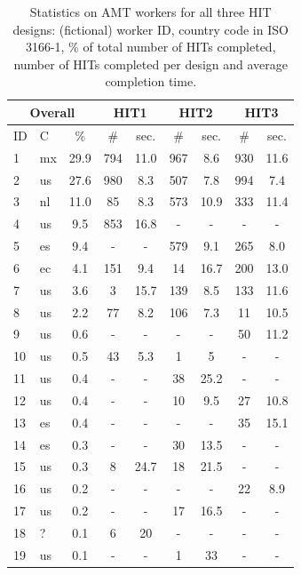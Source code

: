 \documentclass[11pt,letterpaper]{article}
\begin{document}
\begin{table}
\begin{scriptsize}
\begin{tabular}{|l|l|c|c|c|c|c|c|c|}
 \hline
 \multicolumn{3}{|c|}{Overall} & \multicolumn{2}{|c|}{HIT1} & \multicolumn{2}{|c|}{HIT2} & \multicolumn{2}{|c|}{HIT3}  \\ \hline
 ID & C & \% & \# & sec. & \# & sec. & \# & sec. \\ \hline %
 1 & mx & 29.9 & 794 & 11.0 & 967 & 8.6 & 930 & 11.6 \\ %
 2 & us & 27.6 & 980 & 8.3 & 507 & 7.8 & 994 & 7.4 \\ %
 3 & nl & 11.0 & 85 & 8.3 & 573 & 10.9 & 333 & 11.4 \\ %
 4 & us & 9.5 & 853 & 16.8 & - & - & - & - \\ %
 5 & es & 9.4 & - & - & 579 & 9.1 & 265 & 8.0 \\ %
 6 & ec & 4.1 & 151 & 9.4 & 14 & 16.7 & 200 & 13.0 \\ %
 7 & us & 3.6 & 3 & 15.7 & 139 & 8.5 & 133 & 11.6 \\ %
 8 & us & 2.2 & 77 & 8.2 & 106 & 7.3 & 11 & 10.5 \\ %
 9 & us & 0.6 & - & - & - & - & 50 & 11.2 \\ %
 10 & us & 0.5 & 43 & 5.3 & 1 & 5 & - & - \\ %
 11 & us & 0.4 & - & - & 38 & 25.2 & - & - \\ %
 12 & us & 0.4 & - & - & 10 & 9.5 & 27 & 10.8 \\ %
 13 & es & 0.4 & - & - & - & - & 35 & 15.1 \\ %
 14 & es & 0.3 & - & - & 30 & 13.5 & - & - \\ %
 15 & us & 0.3 & 8 & 24.7 & 18 & 21.5 & - & - \\ %
 16 & us & 0.2 & - & - & - & - & 22 & 8.9 \\ %
 17 & us & 0.2 & - & - & 17 & 16.5 & - & - \\ %
 18 & ? & 0.1 & 6 & 20  & - & - & - & -  \\ %
 19 & us & 0.1 & - & - & 1 & 33 & - & -  \\ %
 \hline
\end{tabular}
\end{scriptsize}
\caption{\small Statistics on AMT workers for all three HIT designs: (fictional) worker ID, country code in ISO 3166-1, \% of total number of HITs completed, number of HITs completed per design and average completion time.}
\label{table.stats}
\end{table}
\end{document}
